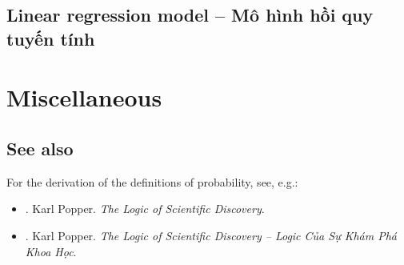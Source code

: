\documentclass{article}
\begin{document}

\subsection{Linear regression model -- Mô hình hồi quy tuyến tính}


\section{Miscellaneous}

\subsection{See also}
For the derivation of the definitions of probability, see, e.g.:
\begin{itemize}
	\item \cite{Popper_logic_science}. {\sc Karl Popper}. {\it The Logic of Scientific Discovery}.
	
	\item \cite{Popper_logic_khoa_hoc}. {\sc Karl Popper}. {\it The Logic of Scientific Discovery -- Logic Của Sự Khám Phá Khoa Học}.
\end{itemize}


\printbibliography[heading=bibintoc]
	
\end{document}
